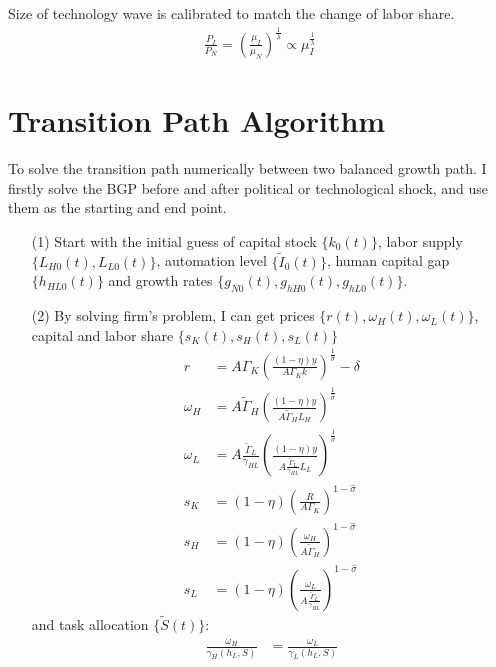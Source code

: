 \documentclass[12pt]{article}
\begin{document}
\begin{appendices}
Size of technology wave is calibrated to match the change of labor share. 
\begin{align*}
\frac{P_I}{P_N} =(\frac{\mu_I}{\mu_N})^{\frac{1}{\lambda}} \propto \mu_I^{\frac{1}{\lambda}}
\end{align*}




\section{Transition Path Algorithm}

To solve the transition path numerically between two balanced growth path. I firstly solve the BGP before and after political or technological shock, and use them as the starting and end point. 

\begin{itemize}
\item[(1)] Start with the initial guess of capital stock $\{k_0(t)\}$, labor supply $\{L_{H0}(t), L_{L0}(t)\}$, automation level $\{\tilde{I}_0(t)\}$, human capital gap $\{h_{HL0}(t)\}$ and growth rates $\{g_{N0}(t),g_{hH0}(t),g_{hL0}(t)\}$. 


\item[(2)] By solving firm's problem, I can get prices $\{r(t),\omega_H(t),\omega_L(t)\}$, capital and labor share $\{s_K(t),s_H(t),s_L(t)\}$
\begin{align*}
r &= A \Gamma_K(\frac{(1-\eta)y}{A\Gamma_Kk})^{\frac{1}{\hat{\sigma}}}-\delta \\
\omega_H &= A \tilde{\Gamma}_H(\frac{(1-\eta)y}{A\tilde{\Gamma}_HL_H})^{\frac{1}{\hat{\sigma}}} \\
\omega_L &= A \frac{\tilde{\Gamma}_L}{\gamma_{HL}}(\frac{(1-\eta)y}{A\frac{\tilde{\Gamma}_L}{\gamma_{HL}}L_L})^{\frac{1}{\hat{\sigma}}} \\
s_K &= (1-\eta)(\frac{R}{A\Gamma_K})^{1-\hat{\sigma}} \\
s_H &= (1-\eta)(\frac{\omega_H}{A \tilde{\Gamma}_H})^{1-\hat{\sigma}} \\
s_L &= (1-\eta)(\frac{\omega_L}{A \frac{\tilde{\Gamma}_L}{\gamma_{HL}}})^{1-\hat{\sigma}} 
\end{align*}
and task allocation $\{\tilde{S}(t)\}$: 
\begin{align*}
\frac{\omega_H}{\gamma_H(h_L,S)} &= \frac{\omega_L}{\gamma_L(h_L,S)}
\end{align*}


\end{itemize}
\end{appendices}
\end{document}
